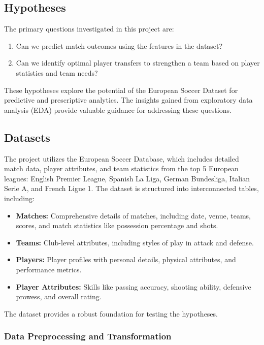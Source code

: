 \documentclass{article}
\begin{document}
\subsection{Hypotheses}

The primary questions investigated in this project are:
\begin{enumerate}
    \item Can we predict match outcomes using the features in the dataset? 
    \item Can we identify optimal player transfers to strengthen a team based on player statistics and team needs?
\end{enumerate}

These hypotheses explore the potential of the European Soccer Dataset for predictive and prescriptive analytics. The insights gained from exploratory data analysis (EDA) provide valuable guidance for addressing these questions.

\subsection{Datasets}

The project utilizes the European Soccer Database, which includes detailed match data, player attributes, and team statistics from the top 5 European leagues: English Premier League, Spanish La Liga, German Bundesliga, Italian Serie A, and French Ligue 1. The dataset is structured into interconnected tables, including:
\begin{itemize}
    \item \textbf{Matches:} Comprehensive details of matches, including date, venue, teams, scores, and match statistics like possession percentage and shots.
    \item \textbf{Teams:} Club-level attributes, including styles of play in attack and defense.
    \item \textbf{Players:} Player profiles with personal details, physical attributes, and performance metrics.
    \item \textbf{Player Attributes:} Skills like passing accuracy, shooting ability, defensive prowess, and overall rating.
\end{itemize}

The dataset provides a robust foundation for testing the hypotheses.

\subsubsection{Data Preprocessing and Transformation}
\end{document}
